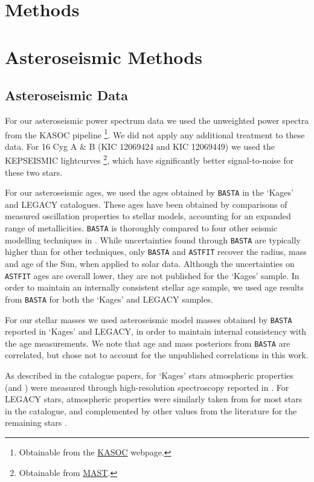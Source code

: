 \section*{Methods}
\setcounter{tocdepth}{2}
\tableofcontents
\section{Asteroseismic Methods}
\subsection{Asteroseismic Data}
For our asteroseismic power spectrum data we used the unweighted power spectra from the KASOC pipeline \cite{handberg+lund2014}\footnote{Obtainable from the \href{http://kasoc.phys.au.dk/}{KASOC} webpage.}. We did not apply any additional treatment to these data. For 16 Cyg A \& B (KIC 12069424 and KIC 12069449) we used the KEPSEISMIC lightcurves \cite{garcia+2011}\footnote{Obtainable from \href{https://archive.
		stsci.edu/prepds/kepseismic/}{MAST}.}, which have significantly better signal-to-noise for these two stars.

For our asteroseismic ages, we used the ages obtained by \texttt{BASTA} \cite[BAyesian STellar Algorithm]{silvaaguirre+2015} in the `Kages' and LEGACY catalogues. These ages have been obtained by comparisons of measured oscillation properties to stellar models, accounting for an expanded range of metallicities. \texttt{BASTA} is thoroughly compared to four other seismic modelling techniques in \cite{silvaaguirre+2017}. While uncertainties found through \texttt{BASTA} are typically higher than for other techniques, only \texttt{BASTA} and \texttt{ASTFIT} \cite[Aarhus STellar Evolution Code]{christensen-dalsgaard2008} recover the radius, mass and age of the Sun, when applied to solar data. Although the uncertainties on \texttt{ASTFIT} ages are overall lower, they are not published for the `Kages' sample. In order to maintain an internally consistent stellar age sample, we used age results from \texttt{BASTA} for both the `Kages' and LEGACY samples.

For our stellar masses we used asteroseismic model masses obtained by \texttt{BASTA} reported in `Kages' and LEGACY, in order to maintain internal consistency with the age measurements. We note that age and mass posteriors from \texttt{BASTA} are correlated, but chose not to account for the unpublished correlations in this work.

As described in the catalogue papers, for `Kages' stars atmospheric properties (\teff and \feh) were measured through high-resolution spectroscopy reported in \cite{huber+2013a}. For LEGACY stars, atmospheric properties were similarly taken from \cite{buchhave+latham2015} for most stars in the catalogue, and complemented by other values from the literature for the remaining stars \cite[see Table 3]{silvaaguirre+2017}.

